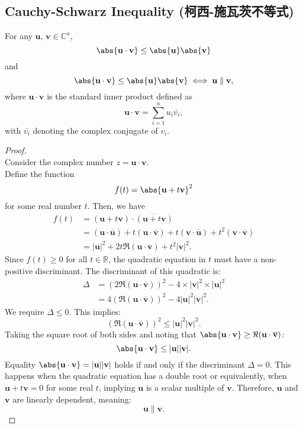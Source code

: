 \documentclass[a4paper,12pt]{article}
\begin{document}
\subsection{Cauchy-Schwarz Inequality (柯西-施瓦茨不等式)}
For any \( \mathbf{u},\,\mathbf{v}\in\mathbb{C}^n \),
\[ \abs{\mathbf{u}\cdot\mathbf{v}}\leq\abs{\mathbf{u}}\abs{\mathbf{v}}\]
and
\[ \abs{\mathbf{u}\cdot\mathbf{v}}\leq\abs{\mathbf{u}}\abs{\mathbf{v}}\iff\mathbf{u}\parallel\mathbf{v}, \]
where \( \mathbf{u} \cdot \mathbf{v} \) is the standard inner product defined as
\[
\mathbf{u} \cdot \mathbf{v} = \sum_{i=1}^{n} u_i \overline{v_i},
\]
with \( \overline{v_i} \) denoting the complex conjugate of \( v_i \).
\begin{proof}\mbox{}\\
Consider the complex number \( z = \mathbf{u} \cdot \mathbf{v} \).\\
Define the function
\[
f(t) = \abs{ \mathbf{u} + t\mathbf{v} }^2
\]
for some real number \( t \). Then, we have
\[\begin{aligned}
f(t) &= \left( \mathbf{u} + t\mathbf{v} \right) \cdot \overline{\left( \mathbf{u} + t\mathbf{v} \right)}\\
&= \left( \mathbf{u} \cdot \overline{\mathbf{u}} \right) + t \left( \mathbf{u} \cdot \overline{\mathbf{v}} \right) + t \left( \mathbf{v} \cdot \overline{\mathbf{u}} \right) + t^2 \left( \mathbf{v} \cdot \overline{\mathbf{v}} \right)\\
&= |\mathbf{u}|^2 + 2t \Re(\mathbf{u} \cdot \overline{\mathbf{v}}) + t^2 |\mathbf{v}|^2.
\end{aligned}\]
Since \( f(t) \geq 0 \) for all \( t \in \mathbb{R} \), the quadratic equation in \( t \) must have a non-positive discriminant. The discriminant of this quadratic is:
\[\begin{aligned}
\Delta &= \left( 2 \Re(\mathbf{u} \cdot \overline{\mathbf{v}}) \right)^2 - 4 \times |\mathbf{v}|^2 \times |\mathbf{u}|^2\\
&= 4 \left( \Re(\mathbf{u} \cdot \overline{\mathbf{v}}) \right)^2 - 4 |\mathbf{u}|^2 |\mathbf{v}|^2.
\end{aligned}\]
We require \( \Delta \leq 0 \). This implies:
\[
\left( \Re(\mathbf{u} \cdot \overline{\mathbf{v}}) \right)^2 \leq |\mathbf{u}|^2 |\mathbf{v}|^2.
\]
Taking the square root of both sides and noting that \( \abs{\mathbf{u}\cdot\mathbf{v}} \geq \Re(\mathbf{u} \cdot \overline{\mathbf{v}}) \):
\[
\abs{\mathbf{u}\cdot\mathbf{v}} \leq |\mathbf{u}| |\mathbf{v}|.
\]
Equality \( \abs{\mathbf{u}\cdot\mathbf{v}} = |\mathbf{u}| |\mathbf{v}| \) holds if and only if the discriminant \( \Delta = 0 \). This happens when the quadratic equation has a double root or equivalently, when \( \mathbf{u} + t\mathbf{v} = 0 \) for some real \( t \), implying \( \mathbf{u} \) is a scalar multiple of \( \mathbf{v} \). Therefore, \( \mathbf{u} \) and \( \mathbf{v} \) are linearly dependent, meaning:
\[\mathbf{u}\parallel\mathbf{v}.\]
\end{proof}
\end{document}
